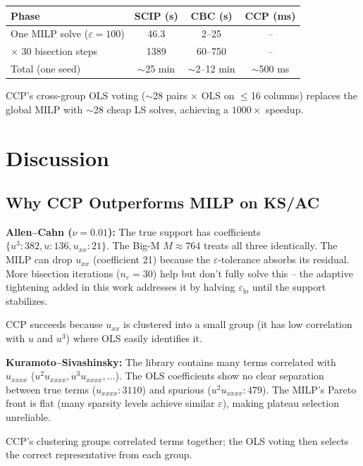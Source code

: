 \documentclass[11pt]{article}
\begin{document}
\begin{center}
\begin{tabular}{lccc}
\toprule
Phase & SCIP (s) & CBC (s) & CCP (ms) \\
\midrule
One MILP solve ($\varepsilon=100$) & 46.3 & 2--25 & -- \\
$\times$ 30 bisection steps & 1389 & 60--750 & -- \\
Total (one seed) & $\sim$25 min & $\sim$2--12 min & $\sim$500 ms \\
\bottomrule
\end{tabular}
\end{center}

CCP's cross-group OLS voting ($\sim$28 pairs $\times$ OLS on $\le$16 columns)
replaces the global MILP with $\sim$28 cheap LS solves, achieving a
$1000\times$ speedup.

\section{Discussion}

\subsection{Why CCP Outperforms MILP on KS/AC}

\textbf{Allen--Cahn ($\nu=0.01$):} The true support has coefficients
$\{u^3: 382, u: 136, u_{xx}: 21\}$. The Big-M $M \approx 764$ treats all
three identically. The MILP can drop $u_{xx}$ (coefficient 21) because
the $\varepsilon$-tolerance absorbs its residual. More bisection iterations
($n_{\varepsilon}=30$) help but don't fully solve this -- the adaptive
tightening added in this work addresses it by halving $\varepsilon_{\text{lo}}$
until the support stabilizes.

CCP succeeds because $u_{xx}$ is clustered into a small group (it has low
correlation with $u$ and $u^3$) where OLS easily identifies it.

\textbf{Kuramoto--Sivashinsky:} The library contains many terms correlated
with $u_{xxxx}$ ($u^2 u_{xxxx}, u^3u_{xxxx}, \ldots$). The OLS coefficients
show no clear separation between true terms ($u_{xxxx}: 3110$) and
spurious ($u^2 u_{xxxx}: 479$). The MILP's Pareto front is flat (many
sparsity levels achieve similar $\varepsilon$), making plateau selection
unreliable.

CCP's clustering groups correlated terms together; the OLS voting then
selects the correct representative from each group.
\end{document}
